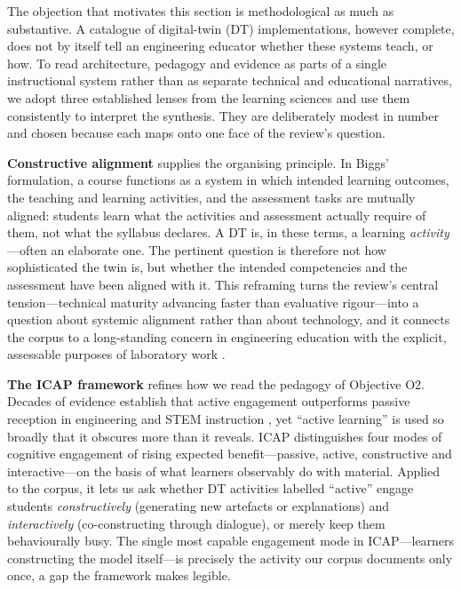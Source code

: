 The objection that motivates this section is methodological as much as
substantive. A catalogue of digital-twin (DT) implementations, however complete,
does not by itself tell an engineering educator whether these systems teach, or
how. To read architecture, pedagogy and evidence as parts of a single
instructional system rather than as separate technical and educational
narratives, we adopt three established lenses from the learning sciences and use
them consistently to interpret the synthesis. They are deliberately modest in
number and chosen because each maps onto one face of the review's question.

\textbf{Constructive alignment} \citep{biggs_enhancing_1996, biggs_teaching_2011} supplies
the organising principle. In Biggs' formulation, a course functions as a system
in which intended learning outcomes, the teaching and learning activities, and
the assessment tasks are mutually aligned: students learn what the activities and
assessment actually require of them, not what the syllabus declares. A DT is, in
these terms, a learning \emph{activity}---often an elaborate one. The pertinent question
is therefore not how sophisticated the twin is, but whether the intended
competencies and the assessment have been aligned with it. This reframing turns
the review's central tension---technical maturity advancing faster than evaluative
rigour---into a question about systemic alignment rather than about technology, and
it connects the corpus to a long-standing concern in engineering education with
the explicit, assessable purposes of laboratory work \citep{feisel_role_2005}.

\textbf{The ICAP framework} \citep{chi_icap_2014} refines how we read the pedagogy of
Objective O2. Decades of evidence establish that active engagement outperforms
passive reception in engineering and STEM instruction \citep{prince_does_2004, freeman_active_2014}, yet ``active learning'' is used so broadly that it obscures
more than it reveals. ICAP distinguishes four modes of cognitive engagement of
rising expected benefit---passive, active, constructive and interactive---on the
basis of what learners observably do with material. Applied to the corpus, it
lets us ask whether DT activities labelled ``active'' engage students
\emph{constructively} (generating new artefacts or explanations) and \emph{interactively}
(co-constructing through dialogue), or merely keep them behaviourally busy. The
single most capable engagement mode in ICAP---learners constructing the model
itself---is precisely the activity our corpus documents only once, a gap the
framework makes legible.

